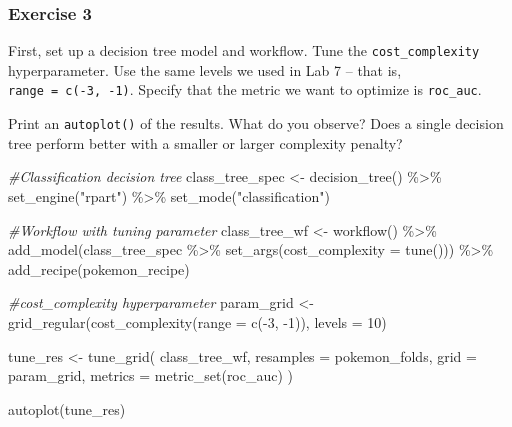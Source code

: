 \documentclass[
]{article}
\newenvironment{Shaded}{\begin{snugshade}}{\end{snugshade}}
\newcommand{\AttributeTok}[1]{\textcolor[rgb]{0.77,0.63,0.00}{#1}}
\newcommand{\CommentTok}[1]{\textcolor[rgb]{0.56,0.35,0.01}{\textit{#1}}}
\newcommand{\DecValTok}[1]{\textcolor[rgb]{0.00,0.00,0.81}{#1}}
\newcommand{\FunctionTok}[1]{\textcolor[rgb]{0.00,0.00,0.00}{#1}}
\newcommand{\NormalTok}[1]{#1}
\newcommand{\OtherTok}[1]{\textcolor[rgb]{0.56,0.35,0.01}{#1}}
\newcommand{\SpecialCharTok}[1]{\textcolor[rgb]{0.00,0.00,0.00}{#1}}
\newcommand{\StringTok}[1]{\textcolor[rgb]{0.31,0.60,0.02}{#1}}
\begin{document}
\hypertarget{exercise-3}{%
\subsubsection{Exercise 3}\label{exercise-3}}

First, set up a decision tree model and workflow. Tune the
\texttt{cost\_complexity} hyperparameter. Use the same levels we used in
Lab 7 -- that is, \texttt{range\ =\ c(-3,\ -1)}. Specify that the metric
we want to optimize is \texttt{roc\_auc}.

Print an \texttt{autoplot()} of the results. What do you observe? Does a
single decision tree perform better with a smaller or larger complexity
penalty?

\begin{Shaded}
\begin{Highlighting}[]
\CommentTok{\#Classification decision tree}
\NormalTok{class\_tree\_spec }\OtherTok{\textless{}{-}} \FunctionTok{decision\_tree}\NormalTok{() }\SpecialCharTok{\%\textgreater{}\%}
  \FunctionTok{set\_engine}\NormalTok{(}\StringTok{"rpart"}\NormalTok{) }\SpecialCharTok{\%\textgreater{}\%}
  \FunctionTok{set\_mode}\NormalTok{(}\StringTok{"classification"}\NormalTok{)}

\CommentTok{\#Workflow with tuning parameter}
\NormalTok{class\_tree\_wf }\OtherTok{\textless{}{-}} \FunctionTok{workflow}\NormalTok{() }\SpecialCharTok{\%\textgreater{}\%}
  \FunctionTok{add\_model}\NormalTok{(class\_tree\_spec }\SpecialCharTok{\%\textgreater{}\%} \FunctionTok{set\_args}\NormalTok{(}\AttributeTok{cost\_complexity =} \FunctionTok{tune}\NormalTok{())) }\SpecialCharTok{\%\textgreater{}\%}
  \FunctionTok{add\_recipe}\NormalTok{(pokemon\_recipe)}

\CommentTok{\#cost\_complexity hyperparameter}
\NormalTok{param\_grid }\OtherTok{\textless{}{-}} \FunctionTok{grid\_regular}\NormalTok{(}\FunctionTok{cost\_complexity}\NormalTok{(}\AttributeTok{range =} \FunctionTok{c}\NormalTok{(}\SpecialCharTok{{-}}\DecValTok{3}\NormalTok{, }\SpecialCharTok{{-}}\DecValTok{1}\NormalTok{)), }\AttributeTok{levels =} \DecValTok{10}\NormalTok{)}

\NormalTok{tune\_res }\OtherTok{\textless{}{-}} \FunctionTok{tune\_grid}\NormalTok{(}
\NormalTok{  class\_tree\_wf, }
  \AttributeTok{resamples =}\NormalTok{ pokemon\_folds, }
  \AttributeTok{grid =}\NormalTok{ param\_grid, }
  \AttributeTok{metrics =} \FunctionTok{metric\_set}\NormalTok{(roc\_auc)}
\NormalTok{)}

\FunctionTok{autoplot}\NormalTok{(tune\_res)}
\end{Highlighting}
\end{Shaded}
\end{document}
